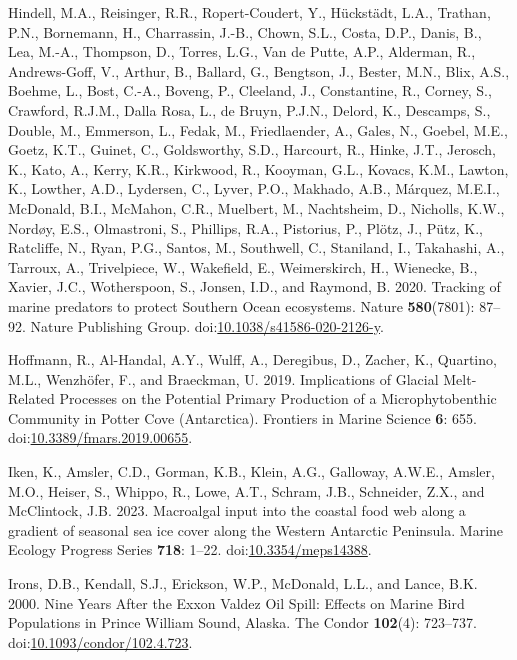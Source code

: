 \documentclass[
]{article}
\newlength{\cslhangindent}
\newenvironment{CSLReferences}[2] %
 {\begin{list}{}{%
  \setlength{\itemindent}{0pt}
  \setlength{\leftmargin}{0pt}
  \setlength{\parsep}{0pt}
  \ifodd #1
   \setlength{\leftmargin}{\cslhangindent}
   \setlength{\itemindent}{-1\cslhangindent}
  \fi
  \setlength{\itemsep}{#2\baselineskip}}}
 {\end{list}}
\begin{document}
\begin{CSLReferences}{1}{0}
Hindell, M.A., Reisinger, R.R., Ropert-Coudert, Y., Hückstädt, L.A.,
Trathan, P.N., Bornemann, H., Charrassin, J.-B., Chown, S.L., Costa,
D.P., Danis, B., Lea, M.-A., Thompson, D., Torres, L.G., Van de Putte,
A.P., Alderman, R., Andrews-Goff, V., Arthur, B., Ballard, G., Bengtson,
J., Bester, M.N., Blix, A.S., Boehme, L., Bost, C.-A., Boveng, P.,
Cleeland, J., Constantine, R., Corney, S., Crawford, R.J.M., Dalla Rosa,
L., de Bruyn, P.J.N., Delord, K., Descamps, S., Double, M., Emmerson,
L., Fedak, M., Friedlaender, A., Gales, N., Goebel, M.E., Goetz, K.T.,
Guinet, C., Goldsworthy, S.D., Harcourt, R., Hinke, J.T., Jerosch, K.,
Kato, A., Kerry, K.R., Kirkwood, R., Kooyman, G.L., Kovacs, K.M.,
Lawton, K., Lowther, A.D., Lydersen, C., Lyver, P.O., Makhado, A.B.,
Márquez, M.E.I., McDonald, B.I., McMahon, C.R., Muelbert, M.,
Nachtsheim, D., Nicholls, K.W., Nordøy, E.S., Olmastroni, S., Phillips,
R.A., Pistorius, P., Plötz, J., Pütz, K., Ratcliffe, N., Ryan, P.G.,
Santos, M., Southwell, C., Staniland, I., Takahashi, A., Tarroux, A.,
Trivelpiece, W., Wakefield, E., Weimerskirch, H., Wienecke, B., Xavier,
J.C., Wotherspoon, S., Jonsen, I.D., and Raymond, B. 2020. Tracking of
marine predators to protect {Southern Ocean} ecosystems. Nature
\textbf{580}(7801): 87--92. Nature Publishing Group.
doi:\href{https://doi.org/10.1038/s41586-020-2126-y}{10.1038/s41586-020-2126-y}.

Hoffmann, R., Al-Handal, A.Y., Wulff, A., Deregibus, D., Zacher, K.,
Quartino, M.L., Wenzhöfer, F., and Braeckman, U. 2019. Implications of
{Glacial Melt-Related Processes} on the {Potential Primary Production}
of a {Microphytobenthic Community} in {Potter Cove} ({Antarctica}).
Frontiers in Marine Science \textbf{6}: 655.
doi:\href{https://doi.org/10.3389/fmars.2019.00655}{10.3389/fmars.2019.00655}.

Iken, K., Amsler, C.D., Gorman, K.B., Klein, A.G., Galloway, A.W.E.,
Amsler, M.O., Heiser, S., Whippo, R., Lowe, A.T., Schram, J.B.,
Schneider, Z.X., and McClintock, J.B. 2023. Macroalgal input into the
coastal food web along a gradient of seasonal sea ice cover along the
{Western Antarctic Peninsula}. Marine Ecology Progress Series
\textbf{718}: 1--22.
doi:\href{https://doi.org/10.3354/meps14388}{10.3354/meps14388}.

Irons, D.B., Kendall, S.J., Erickson, W.P., McDonald, L.L., and Lance,
B.K. 2000. Nine {Years After} the {Exxon Valdez Oil Spill}: {Effects} on
{Marine Bird Populations} in {Prince William Sound}, {Alaska}. The
Condor \textbf{102}(4): 723--737.
doi:\href{https://doi.org/10.1093/condor/102.4.723}{10.1093/condor/102.4.723}.


\end{CSLReferences}
\end{document}
